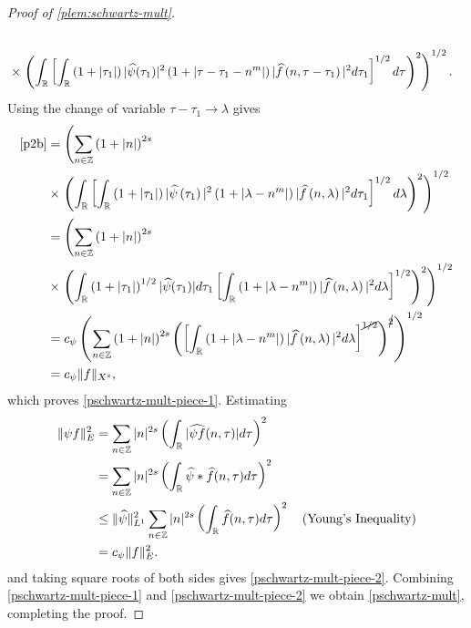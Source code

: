 \begin{proof}[Proof of \cref{plem:schwartz-mult}]
\begin{equation}
\begin{split}
		\\
		& \times \left. \left( \int_{\mathbb{R}} \left[ \int_{\mathbb{R}}
		\left( 1 + | \tau_{1} | \right) | \widehat{\psi}(\tau_1) |^2 \left( 1 + |
		\tau - \tau_1 - n^{m} |
		\right) | \widehat{f}\left( n, \tau - \tau_1 \right) |^2 d \tau_1 
		\right]^{1/2} d \tau \right)^2 \right)^{1/2}.
	\end{split}
\end{equation}
%
%
Using the change of variable $\tau - \tau_1 \to \lambda$ gives
%
%
\begin{equation*}
	\begin{split}
		\eqref{p2b}
		& = \left( \sum_{n \in \mathbb{Z}} \left (1 + |n| \right )^{2s}\right.
		\\
		& \times \left.  \left( \int_{\mathbb{R}} \left[
		\int_{\mathbb{R}} \left( 1 + | \tau_1 | \right) | \widehat{\psi}\left( \tau_1
		\right) |^2 \left( 1 + | \lambda - n^{m} | \right) | \widehat{f} \left( n,
		\lambda
		\right)|^2 d \tau_1 \right]^{1/2} d \lambda \right)^2 \right)^{1/2}
		\\
		& =  \left( \sum_{n \in \mathbb{Z}} \left (1 + |n| \right )^{2s} \right.
		\\
		& \times \left. \left( \int_{\mathbb{R}} \left( 1 + |
		\tau_1 |
		\right)^{1/2} | \widehat{\psi}(\tau_1) | d \tau_1 \left[ \int_{\mathbb{R}} \left( 1 + |
		\lambda - n^{m} |
		\right) | \widehat{f}\left( n, \lambda \right) |^2 d \lambda \right]^{1/2}
		\right)^2 \right)^{1/2}
		\\
		& = c_{\psi} \left( \sum_{n \in \mathbb{Z}} \left (1 + |n| \right )^{2s} \left( \left[ \int_{\mathbb{R}}
		\left( 1 + | \lambda - n^{m} | \right) | \widehat{f}\left( n, \lambda
		\right) |^2 d \lambda
		\right]^{\cancel{1/2}} \right)^{\cancel{2}} \right)^{1/2}
		\\
		& = c_{\psi} \|f\|_{X^s},
	\end{split}
\end{equation*}
%
%
which proves \eqref{pschwartz-mult-piece-1}.
Estimating 
%
%
\begin{equation*}
\begin{split}
  \| \psi f \|_{E}^{2}
  & = \sum_{n \in \mathbb{Z}} | n |^{2s} \left( \int_{\mathbb{R}} |
  \widehat{\psi f}(n, \tau)
  | d \tau \right)^{2}
  \\
  & = \sum_{n \in \mathbb{Z}} | n |^{2s} \left( \int_{\mathbb{R}} \widehat{\psi} * \widehat{f}
  (n, \tau) d \tau \right)^{2}
  \\
  & \le \| \widehat{\psi} \|_{L^1}^{2} \sum_{n \in \mathbb{Z}} | n |^{2s} \left(
  \int_{\mathbb{R}} \widehat{f}(n, \tau) d \tau
  \right)^{2} \quad \text{(Young's Inequality)}
  \\
  & = c_{\psi} \| f \|_{E}^2.
\end{split}
\end{equation*}
%
%
and taking square roots of both sides gives \eqref{pschwartz-mult-piece-2}. Combining
\eqref{pschwartz-mult-piece-1} and \eqref{pschwartz-mult-piece-2} we obtain
\eqref{pschwartz-mult}, completing the proof.  
\end{proof}
